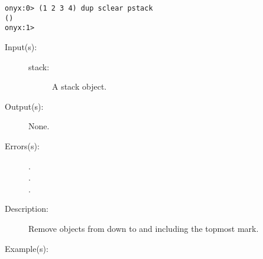 \begin{description}
\begin{description}
\begin{verbatim}
onyx:0> (1 2 3 4) dup sclear pstack
()
onyx:1>
		\end{verbatim}
	\end{description}
\label{systemdict:scleartomark}
\item[{\onyxop{stack}{scleartomark}{--}}: ]
	\begin{description}\item[]
	\item[Input(s): ]
		\begin{description}\item[]
		\item[stack: ]
			A stack object.
		\end{description}
	\item[Output(s): ] None.
	\item[Errors(s): ]
		\begin{description}\item[]
		\item[.]
		\item[.]
		\item[.]
		\end{description}
	\item[Description: ]
		Remove objects from  down to and including the
		topmost mark.
	\item[Example(s): ]\begin{verbatim}


\end{verbatim}
\end{description}
\end{description}
